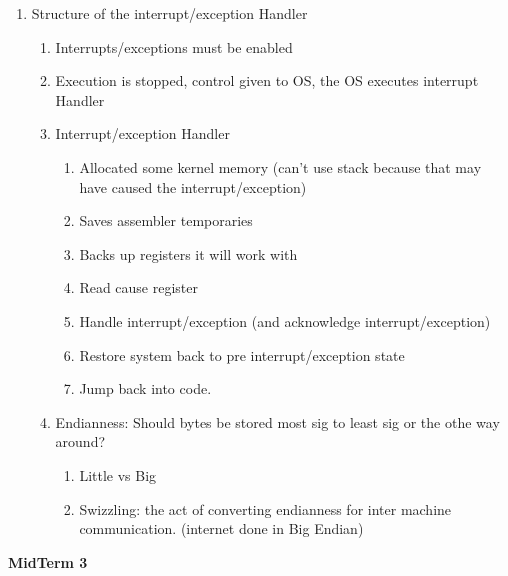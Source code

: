 \documentclass[12pt]{article}
\renewcommand{\=}[1]{\stackrel{#1}{=}} %
\theoremstyle{definition}
\theoremstyle{remark}
\begin{document}
\begin{enumerate}
\begin{enumerate}
    \item Structure of the interrupt/exception Handler
      \begin{enumerate}
      \item Interrupts/exceptions must be enabled
      \item Execution is stopped, control given to OS, the OS executes
        interrupt Handler
      \item Interrupt/exception Handler
        \begin{enumerate}
        \item Allocated some kernel memory (can't use stack because
          that may have caused the interrupt/exception)
        \item Saves assembler temporaries
        \item Backs up registers it will work with
        \item Read cause register
        \item Handle interrupt/exception (and acknowledge interrupt/exception)
        \item Restore system back to pre interrupt/exception state
        \item Jump back into code. 
        \end{enumerate}
      \item Endianness: Should bytes be stored most sig to least sig
        or the othe way around?
        \begin{enumerate}
        \item Little vs Big
        \item Swizzling: the act of converting endianness for inter
          machine communication. (internet done in Big Endian)
        \end{enumerate}

      \end{enumerate}

    \end{enumerate}
  \end{enumerate}
  \textbf{MidTerm 3}
\end{document}
